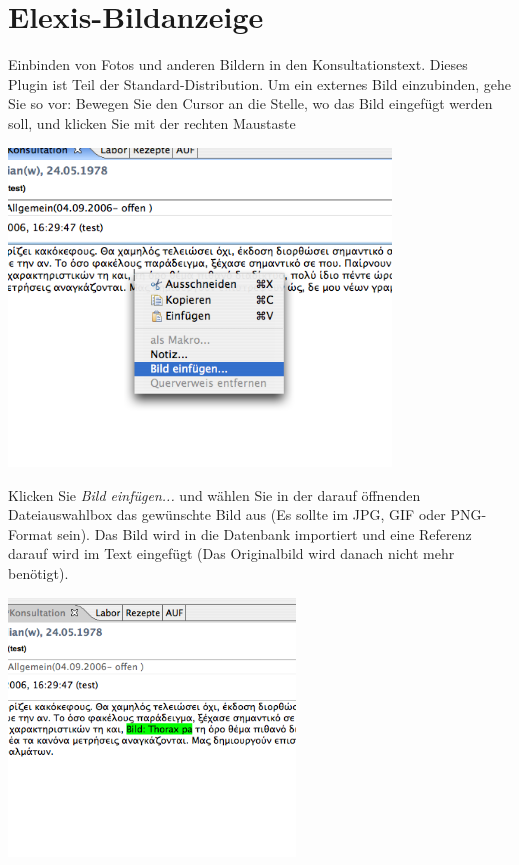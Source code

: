 \section{Elexis-Bildanzeige}
Einbinden von Fotos und anderen Bildern in den Konsultationstext. Dieses Plugin ist Teil der Standard-Distribution. Um ein externes Bild einzubinden, gehe Sie so vor:
 Bewegen Sie den Cursor an die Stelle, wo das Bild eingefügt werden soll, und klicken Sie mit der rechten Maustaste

\includegraphics[width=4in]{images/bild1}


Klicken Sie \textit{Bild einfügen...} und wählen Sie in der darauf öffnenden Dateiauswahlbox das gewünschte Bild aus (Es sollte im JPG, GIF oder PNG-Format sein). Das Bild wird in die Datenbank importiert und eine Referenz darauf wird im Text eingefügt (Das Originalbild wird danach nicht mehr benötigt).

\includegraphics[width=3in]{images/bild2}


